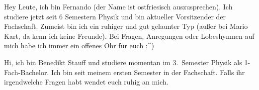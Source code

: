 \begin{multicols*}{2}
{Hey Leute, ich bin Fernando (der Name ist ostfriesisch auszusprechen). Ich studiere jetzt seit 6 Semestern Physik und bin aktueller Vorsitzender der Fachschaft. Zumeist bin ich ein ruhiger und gut gelaunter Typ (außer bei Mario Kart, da kenn ich keine Freunde). Bei Fragen, Anregungen oder Lobeshymnen auf mich habe ich immer ein offenes Ohr für euch :\^{})}

	
{Hi, ich bin Benedikt Stauff und studiere momentan im 3.~Semester Physik als 1-Fach-Bachelor. 
Ich bin seit meinem ersten Semester in der Fachschaft. Falls ihr irgendwelche Fragen habt wendet euch ruhig an mich.}


\end{multicols*}
